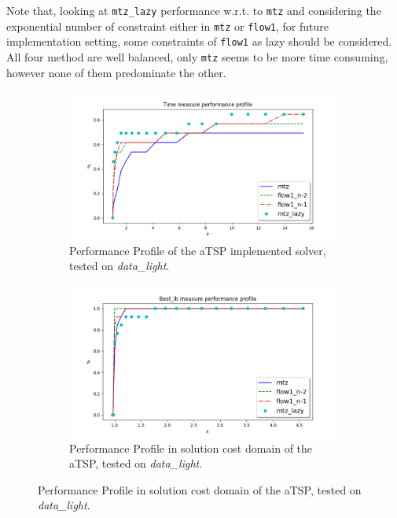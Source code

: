 Note that, looking at \texttt{mtz\_lazy} performance w.r.t. to \texttt{mtz} and considering the exponential number of constraint either in \texttt{mtz} or \texttt{flow1}, for future implementation setting, some constraints of \texttt{flow1} as lazy should be considered.\\
All four method are well balanced, only \texttt{mtz} seems to be more time consuming, however none of them predominate the other.

\begin{figure}[h]
	\begin{subfigure}{\columnwidth}
		\centering
		\includegraphics[width=\columnwidth]{../res/Lmtz_flow1_time.png}
		\caption{Performance Profile of the aTSP implemented solver, tested on \textit{data\_light}.}
	\end{subfigure}
	\begin{subfigure}{\columnwidth}
		\centering
		\includegraphics[width=\columnwidth]{../res/Lmtz_flow1_lb.png}
		\caption{Performance Profile in solution cost domain of the aTSP, tested on \textit{data\_light}.}
	\end{subfigure}
\end{figure}

